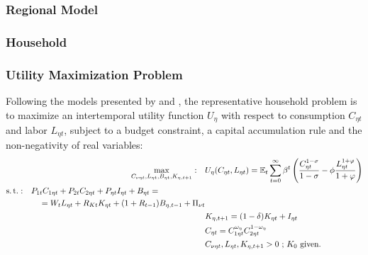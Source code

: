 \documentclass[
thesis.tex
]{subfiles}
\begin{document}
\newpage


\subsubsection*{Regional Model}


\subsubsection{Household}

\subsubsection*{Utility Maximization Problem}

Following the models presented by \textcite{costa_junior_understanding_2016} and \textcite{solis-garcia_ucb_2022}, the representative household problem is to maximize an intertemporal utility function $U_{\eta}$ with respect to consumption $C_{\eta t}$ and labor $L_{\eta t}$, subject to a budget constraint, a capital accumulation rule and the non-negativity of real variables:
\begin{align}
	\max_{C_{\nu \eta t}, L_{\eta t}, B_{\eta t}, K_{\eta, t+1}}: \quad & U_{\eta}(C_{\eta t},L_{\eta t}) = {\mathbb{E}_{t}} \sum_{t=0}^{\infty} \beta^t \left(\frac{C_{\eta t}^{1-\sigma}}{1-\sigma} - \phi \frac{L_{\eta t}^{1+\varphi}}{1+\varphi} \right) \label{eq:reg-utility-function-0} 
	\\
	\begin{split}
		\operatorname{s.t.}: \quad & P_{1t} C_{1\eta t} + P_{2t} C_{2\eta t} + P_{\eta t} I_{\eta t} + B_{\eta t} = \\ & \quad = W_t L_{\eta t} + R_{Kt} K_{\eta t} + (1 + R_{t-1}) B_{\eta,t-1} + \Pi_{\nu t}
	\end{split} \label{eq:reg-budget-constraint} \\
	\quad & K_{\eta, t+1} = (1-\delta)K_{\eta t} + I_{\eta t} \label{eq:reg-law-of-motion-for-capital} \\
	\quad & C_{\eta t} = C_{1\eta t}^{\omega_{\eta}} C_{2\eta t}^{1-\omega_{\eta}} \label{eq:reg-consumption-aggregation} \\
	\quad & C_{\nu\eta t}, L_{\eta t}, K_{\eta, t+1} > 0 \text{ ; $K_0$ given.} \nonumber
\end{align}
\end{document}

